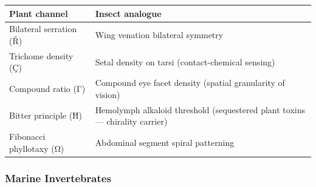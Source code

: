 \documentclass[12pt,a4paper]{article}
\begin{document}
\begin{longtable}[]{@{}ll@{}}
\toprule
\begin{minipage}[b]{0.47\columnwidth}\raggedright
Plant channel\strut
\end{minipage} & \begin{minipage}[b]{0.47\columnwidth}\raggedright
Insect analogue\strut
\end{minipage}\tabularnewline
\midrule
\endhead
\begin{minipage}[t]{0.47\columnwidth}\raggedright
Bilateral serration (Ř)\strut
\end{minipage} & \begin{minipage}[t]{0.47\columnwidth}\raggedright
Wing venation bilateral symmetry\strut
\end{minipage}\tabularnewline
\begin{minipage}[t]{0.47\columnwidth}\raggedright
Trichome density (Ç)\strut
\end{minipage} & \begin{minipage}[t]{0.47\columnwidth}\raggedright
Setal density on tarsi (contact-chemical sensing)\strut
\end{minipage}\tabularnewline
\begin{minipage}[t]{0.47\columnwidth}\raggedright
Compound ratio (Γ)\strut
\end{minipage} & \begin{minipage}[t]{0.47\columnwidth}\raggedright
Compound eye facet density (spatial granularity of vision)\strut
\end{minipage}\tabularnewline
\begin{minipage}[t]{0.47\columnwidth}\raggedright
Bitter principle (Ħ)\strut
\end{minipage} & \begin{minipage}[t]{0.47\columnwidth}\raggedright
Hemolymph alkaloid threshold (sequestered plant toxins --- chirality
carrier)\strut
\end{minipage}\tabularnewline
\begin{minipage}[t]{0.47\columnwidth}\raggedright
Fibonacci phyllotaxy (Ω)\strut
\end{minipage} & \begin{minipage}[t]{0.47\columnwidth}\raggedright
Abdominal segment spiral patterning\strut
\end{minipage}\tabularnewline
\bottomrule
\end{longtable}

\hypertarget{marine-invertebrates}{%
\subsubsection{Marine Invertebrates}\label{marine-invertebrates}}
\end{document}
